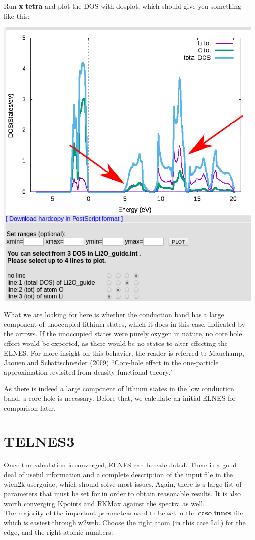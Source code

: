 \documentclass[12pt]{article}
\begin{document}
Run \textbf{x tetra} and plot the DOS with dosplot, which should give you something like this: 


\includegraphics[scale=0.4]{./images/Li2O_dos.png}

What we are looking for here is whether the conduction band has a large component of unoccupied lithium states, which it does in this case, indicated by the arrows.  If the unoccupied states were purely oxygen in nature, no core hole effect would be expected, as there would be no states to alter effecting the ELNES.  For more insight on this behavior, the reader is referred to Mauchamp, Jaouen and Schattschneider (2009) ``Core-hole effect in the one-particle approximation revisited from density functional theory."

As there is indeed a large component of lithium states in the low conduction band, a core hole is necessary. Before that, we calculate an initial ELNES for comparison later.  


\section{TELNES3}

Once the calculation is converged, ELNES can be calculated.  There is a good deal of useful information and a complete description of the input file in the wien2k userguide, which should solve most issues. Again, there is a large list of parameters that must be set for in order to obtain reasonable results. It is also worth converging Kpoints and RKMax against the spectra as well.\\
The majority of the important parameters need to be set in the \textbf{case.innes} file, which is easiest through w2web.  Choose the right atom (in this case Li1) for the edge, and the right atomic numbers:  
\end{document}
